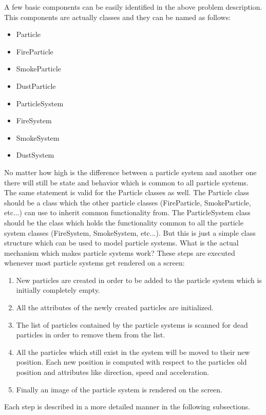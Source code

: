 A few basic components can be easily identified in the above problem description. This components are actually classes and they can be named as follows:

\begin{itemize}
	\item Particle
	\item FireParticle
	\item SmokeParticle
	\item DustParticle
	\item ParticleSystem
	\item FireSystem
	\item SmokeSystem
	\item DustSystem
\end{itemize}

No matter how high is the difference between a particle system and another one there will still be state and behavior which is common to all particle systems. The same statement is valid for the Particle classes as well. The Particle class should be a class which the other particle classes (FireParticle, SmokeParticle, etc...) can use to inherit common functionality from. The ParticleSystem class should be
the class which holds the functionality common to all the particle system classes (FireSystem, SmokeSystem, etc...). But this is just a simple class structure which can be used to model particle systems. What is the actual mechanism which makes particle systems work? These steps are executed whenever most particle systems get rendered on a screen:

\begin{enumerate}
	\item New particles are created in order to be added to the particle system which is initially completely empty.
	\item All the attributes of the newly created particles are initialized.
	\item The list of particles contained by the particle systems is scanned for dead particles in order to remove them from the list.
	\item All the particles which still exist in the system will be moved to their new position. Each new position is computed with respect to the particles old position and attributes like direction, speed and acceleration.
	\item Finally an image of the particle system is rendered on the screen.
\end{enumerate}

Each step is described in a more detailed manner in the following subsections.

